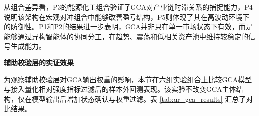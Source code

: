 
从组合差异看，P3的能源化工组合验证了GCA对产业链时滞关系的捕捉能力，P4说明该架构在宏观对冲组合中能够改善盈亏结构，P5则体现了其在高波动环境下的防御性。P1和P2的结果进一步表明，GCA并非只在单一市场状态下有效，而是能够通过异构智能体的协同分工，在趋势、震荡和低相关资产池中维持较稳定的信号生成能力。

\noindent\textbf{辅助校验层的实证效果}\par

为观察辅助校验层对GCA输出权重的影响，本节在六组实验组合上比较GCA模型与接入量化相对强度指标过滤后的样本外回测表现。该实验不改变GCA主体结构，仅在模型输出后增加状态确认与权重过滤。表 \ref{tab:qr_gca_results} 汇总了对比结果。

